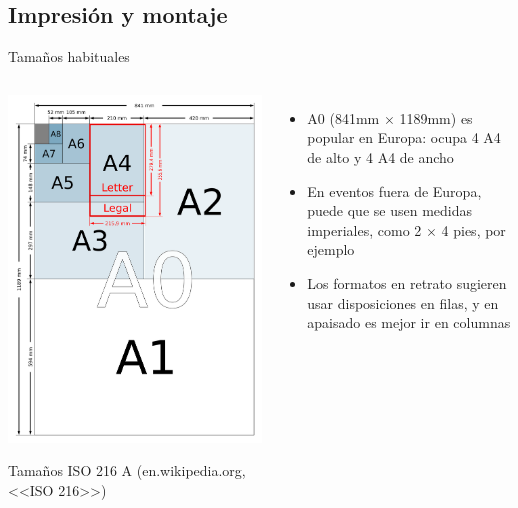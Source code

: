 \documentclass[xcolor=svgnames,compress]{beamer}
\begin{document}
\subsection{Impresión y montaje}

\begin{frame}{Tamaños habituales}
  \begin{columns}

    \begin{center}
      \includegraphics[width=\textwidth,height=.7\textheight,keepaspectratio]{A_size_illustration2_with_letter_and_legal}

      Tamaños ISO 216 A (en.wikipedia.org, <<ISO 216>>)
    \end{center}

    \begin{itemize}
    \item A0 (841mm $\times$ 1189mm) es popular en Europa: ocupa 4 A4
      de alto y 4 A4 de ancho
    \item En eventos fuera de Europa, puede que se usen medidas
      imperiales, como 2 $\times$ 4 pies, por ejemplo
    \item Los formatos en retrato sugieren usar disposiciones en
      filas, y en apaisado es mejor ir en columnas
    \end{itemize}
  \end{columns}
\end{frame}
\end{document}
